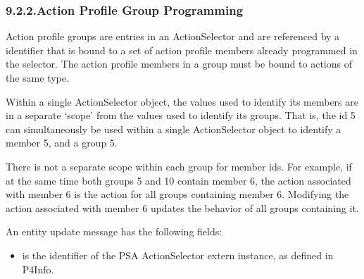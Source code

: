 \documentclass[11pt]{article}
\begin{document}
{%
\subsubsection{9.2.2.\hspace*{0.5em}Action Profile Group Programming}\label{sec-action-profile-group-programming}%

\noindent{}Action profile groups are entries in an ActionSelector and are referenced by a
 identifier that is bound to a set of action profile members already
programmed in the selector. The action profile members in a group must be bound
to actions of the same type.%

Within a single ActionSelector object, the  values used to identify its
members are in a separate \textquoteleft{}scope\textquoteright{} from the  values used to identify its
groups. That is, the id 5 can simultaneously be used within a single
ActionSelector object to identify a member 5, and a group 5.%

There is not a separate scope within each group for member ids. For example, if
at the same time both groups 5 and 10 contain member 6, the action associated
with member 6 is the action for all groups containing member 6. Modifying the
action associated with member 6 updates the behavior of all groups containing
it.%

An  entity update message has the following fields:%

\begin{itemize}%

\item{}
 is the  identifier of the PSA ActionSelector
extern instance, as defined in P4Info.%


\end{itemize}}
\end{document}
